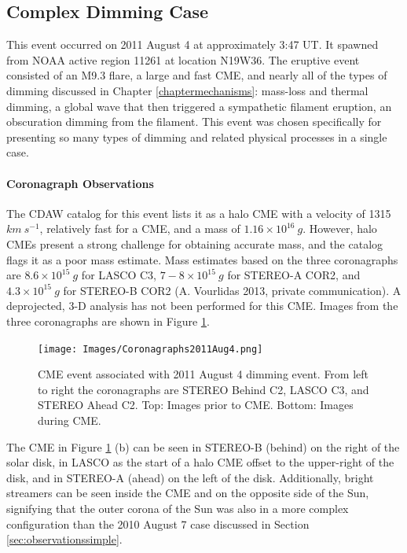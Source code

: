\subsection{Complex Dimming Case}
This event occurred on 2011 August 4 at approximately 3:47 UT. It spawned from NOAA active region 11261 at location N19W36. The eruptive event consisted of an M9.3 flare, a large and fast CME, and nearly all of the types of dimming discussed in Chapter \ref{chaptermechanisms}: mass-loss and thermal dimming, a global wave that then triggered a sympathetic filament eruption, an obscuration dimming from the filament. This event was chosen specifically for presenting so many types of dimming and related physical processes in a single case. 

\paragraph{Coronagraph Observations}
The CDAW catalog for this event lists it as a halo CME with a velocity of 1315 $km\ s^{-1}$, relatively fast for a CME, and a mass of $1.16 \times 10^{16}\ g$. However, halo CMEs present a strong challenge for obtaining accurate mass, and the catalog flags it as a poor mass estimate. Mass estimates based on the three coronagraphs are $8.6 \times 10^{15}\ g$ for LASCO C3, $7-8 \times 10^{15}\ g$ for STEREO-A COR2, and $4.3 \times 10^{15}\ g$ for STEREO-B COR2 (A. Vourlidas 2013, private communication). A deprojected, 3-D analysis has not been performed for this CME. Images from the three coronagraphs are shown in Figure \ref{coronagraphs2011aug4}. 

\begin{figure}[!h]
	\caption[LASCO and STEREO coronagraph data for 2011 August 4 event]{ 
        CME event associated with 2011 August 4 dimming event. From left to right the coronagraphs are STEREO Behind C2, 
        LASCO C3, and STEREO Ahead C2. Top: Images prior to CME. Bottom: Images during CME. 
    }
    \begin{center}
	    \texttt{[image: Images/Coronagraphs2011Aug4.png]}
    \end{center}
    \label{coronagraphs2011aug4}
\end{figure}

The CME in Figure \ref{coronagraphs2011aug4} (b) can be seen in STEREO-B (behind) on the right of the solar disk, in LASCO as the start of a halo CME offset to the upper-right of the disk, and in STEREO-A (ahead) on the left of the disk. Additionally, bright streamers can be seen inside the CME and on the opposite side of the Sun, signifying that the outer corona of the Sun was also in a more complex configuration than the 2010 August 7 case discussed in Section \ref{sec:observationssimple}. 

